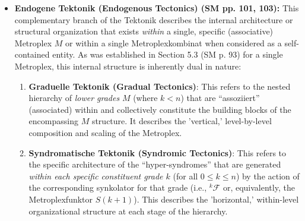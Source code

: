 \documentclass[12pt]{article}
\newcommand{\q}[1]{\enquote{#1}}
\def\metroplex#1#2{M}%
\newcommand{\metroplexsynkolator}[1]{{}^{#1}\mathcal{F}}
\newcommand{\metroplexfunktor}{S}
\begin{document}
\begin{itemize}
    \item \textbf{Endogene Tektonik (Endogenous Tectonics) (SM pp. 101, 103):}
    This complementary branch of the Tektonik describes the internal architecture or structural organization that exists \textit{within} a single, specific (associative) Metroplex \( \metroplex{n}{} \) or within a single Metroplexkombinat when considered as a self-contained entity. As was established in Section 5.3 (SM p. 93) for a single Metroplex, this internal structure is inherently dual in nature:
    \begin{enumerate}
        \item \textbf{Graduelle Tektonik (Gradual Tectonics)}: This refers to the nested hierarchy of \textit{lower grades} \( \metroplex{k}{} \) (where \( k < n \)) that are \q{assoziiert} (associated) within and collectively constitute the building blocks of the encompassing \( \metroplex{n}{} \) structure. It describes the 'vertical,' level-by-level composition and scaling of the Metroplex.
        \item \textbf{Syndromatische Tektonik (Syndromic Tectonics)}: This refers to the specific architecture of the \q{hyper-syndromes} that are generated \textit{within each specific constituent grade \( k \)} (for all \( 0 \leq k \leq n \)) by the action of the corresponding synkolator for that grade (i.e., \( \metroplexsynkolator{k}{} \) or, equivalently, the Metroplexfunktor \( \metroplexfunktor(k+1) \)). This describes the 'horizontal,' within-level organizational structure at each stage of the hierarchy.
    \end{enumerate}


\end{itemize}
\end{document}

